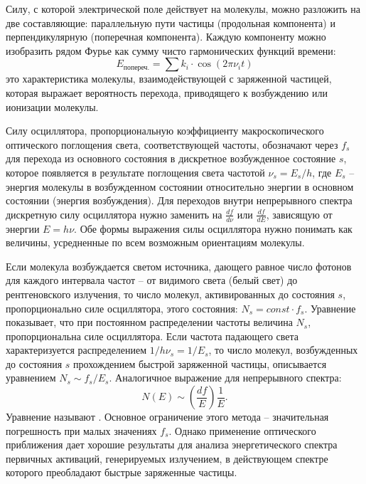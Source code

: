 \documentclass[a4paper, 14pt]{article}
\renewcommand{\emph}[1]{{\color{orange}{\textit{\textbf{#1}}}}}
\begin{document}
Силу, с которой электрической поле действует на молекулы, можно разложить на две составляющие: параллельную пути частицы (продольная компонента) и перпендикулярную (поперечная компонента). Каждую компоненту можно изобразить рядом Фурье как сумму чисто гармонических функций времени:
\begin{equation}
    E_\text{попереч.} = \sum k_i \cdot \cos (2\pi\nu_it)
\end{equation}
\emph{«Сила осциллятора»} это характеристика молекулы, взаимодействующей с
заряженной частицей, которая выражает вероятность перехода, приводящего к
возбуждению или ионизации молекулы.

Силу осциллятора, пропорциональную коэффициенту макроскопического
оптического поглощения света, соответствующей частоты, обозначают через $f_s$ для
перехода из основного состояния в дискретное возбужденное состояние $s$, которое
появляется в результате поглощения света частотой $\nu_s = E_s/h$, где $E_s$ – энергия
молекулы в возбужденном состоянии относительно энергии в основном состоянии
(энергия возбуждения). Для переходов внутри непрерывного спектра дискретную силу
осциллятора нужно заменить на $\frac{df}{d\nu}$ или $\frac{df}{dE}$, зависящую от энергии $E = h\nu$. Обе формы выражения силы осциллятора нужно понимать как величины,
усредненные по всем возможным ориентациям молекулы.

Если молекула возбуждается светом источника, дающего равное число фотонов
для каждого интервала частот – от видимого света (белый свет) до рентгеновского
излучения, то число молекул, активированных до состояния $s$, пропорционально силе
осциллятора, этого состояния: $N_s=const \cdot f_s$. Уравнение показывает, что при
постоянном распределении частоты величина $N_s$, пропорциональна силе осциллятора.
Если частота падающего света характеризуется распределением $1/h\nu_s = 1/E_s$, то
число молекул, возбужденных до состояния $s$ прохождением быстрой заряженной
частицы, описывается уравнением $N_s\sim f_s/E_s$. Аналогичное выражение для
непрерывного спектра: 
\begin{equation}
    N(E)\sim \left (\frac{df}{E} \right )\frac{1}{E}. 
\end{equation}
Уравнение называют \emph{«оптическим приближением»}. Основное ограничение этого метода – значительная погрешность при малых значениях $f_s$. Однако применение оптического приближения дает хорошие результаты для анализа энергетического спектра первичных активаций, генерируемых
излучением, в действующем спектре которого преобладают быстрые заряженные частицы.
\end{document}
